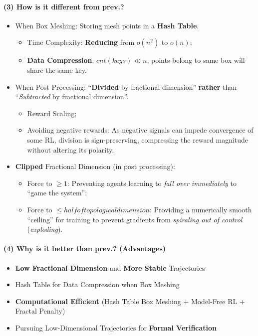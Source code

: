 \documentclass{article}
\begin{document}
\paragraph{(3) How is it different from prev.?}
\begin{itemize}
  \item When Box Meshing: Storing mesh points in a \textbf{Hash Table}.
  \begin{itemize}
    \item Time Complexity: \textbf{Reducing} from ${o(n^2)}$ to \textbf{${o(n)}$};
    \item \textbf{Data Compression}: ${cnt(keys) \ll n}$, points belong to same box will share the same key.
  \end{itemize}
  \item When Post Processing: ``\textbf{Divided} by fractional dimension'' \textbf{rather} than ``\textit{Subtracted} by fractional dimension''.
  \begin{itemize}
    \item Reward Scaling;
    \item Avoiding negative rewards: As negative signals can impede convergence of some RL, division is sign-preserving, compressing the reward magnitude without altering its polarity.
  \end{itemize}
  \item \textbf{Clipped} Fractional Dimension (in post processing):
  \begin{itemize}
    \item Force to ${\ge 1}$: Preventing agents learning to \textit{fall over immediately} to ``game the system'';
    \item Force to ${\le half of topological dimension}$: Providing a numerically smooth ``ceiling'' for training to prevent gradients from \textit{spiraling out of control} (\textit{exploding}).
  \end{itemize}
\end{itemize}

\paragraph{(4) Why is it better than prev.? (Advantages)} 
\begin{itemize}
  \item \textbf{Low Fractional Dimension} and \textbf{More Stable} Trajectories
  \item Hash Table for Data Compression when Box Meshing
  \item \textbf{Computational Efficient} (Hash Table Box Meshing + Model-Free RL + Fractal Penalty)
  \item Pursuing Low-Dimensional Trajectories for \textbf{Formal Verification}
\end{itemize}
\end{document}
